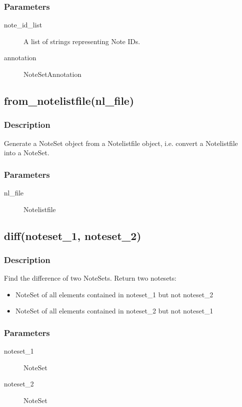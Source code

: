 \subsubsection{Parameters}
\begin{description}
\item [note\_id\_list] A list of strings representing Note IDs.
\item [annotation] NoteSetAnnotation
\end{description}


\subsection{from\_notelistfile(nl\_file)}
\subsubsection{Description}
Generate a NoteSet object from a Notelistfile object, i.e. convert a Notelistfile into a NoteSet.
\subsubsection{Parameters}
\begin{description}
\item [nl\_file] Notelistfile 
\end{description}

\subsection{diff(noteset\_1, noteset\_2)}
\subsubsection{Description}
Find the difference of two NoteSets. Return two notesets:
\begin{itemize}
	\item NoteSet of all elements contained in noteset\_1 but not noteset\_2
	\item NoteSet of all elements contained in noteset\_2 but not noteset\_1
\end{itemize}
\subsubsection{Parameters}
\begin{description}
\item [noteset\_1] NoteSet
\item [noteset\_2] NoteSet
\end{description} 

